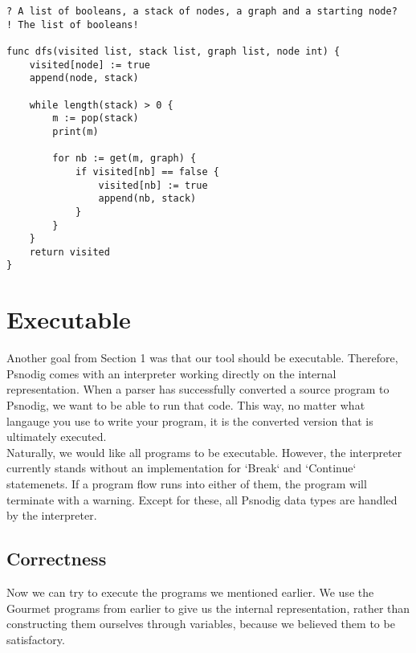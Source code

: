 \begin{lstlisting}[caption={DFS implementation in Gourmet.}, captionpos=b, label={dfsGourmet}]
? A list of booleans, a stack of nodes, a graph and a starting node?
! The list of booleans!

func dfs(visited list, stack list, graph list, node int) {
    visited[node] := true
    append(node, stack)

    while length(stack) > 0 {
        m := pop(stack)
        print(m)

        for nb := get(m, graph) {
            if visited[nb] == false {
                visited[nb] := true
                append(nb, stack)
            }
        }
    }
    return visited
}
\end{lstlisting}

\section{Executable}

Another goal from Section 1 was that our tool should be executable. Therefore, Psnodig comes with an interpreter working directly on the internal representation. When a parser has successfully converted a source program to Psnodig, we want to be able to run that code. This way, no matter what langauge you use to write your program, it is the converted version that is ultimately executed. \\

Naturally, we would like all programs to be executable. However, the interpreter currently stands without an implementation for `Break` and `Continue` statemenets. If a program flow runs into either of them, the program will terminate with a warning. Except for these, all Psnodig data types are handled by the interpreter.

\subsection{Correctness}

Now we can try to execute the programs we mentioned earlier. We use the Gourmet programs from earlier to give us the internal representation, rather than constructing them ourselves through variables, because we believed them to be satisfactory. \\



